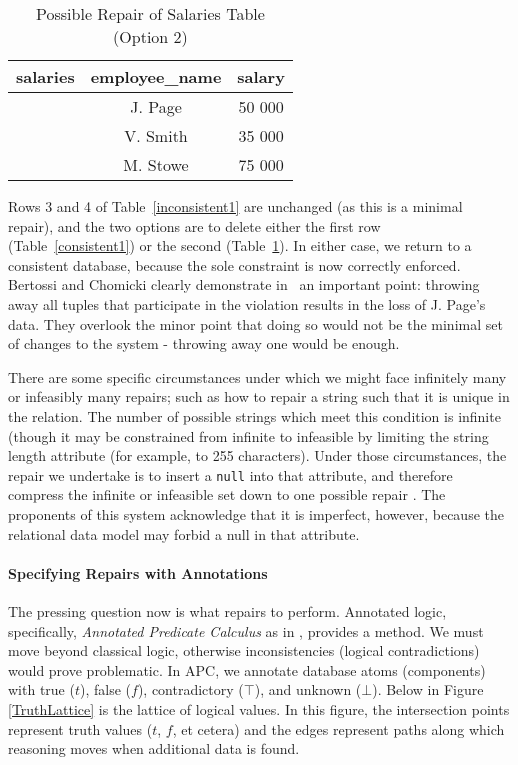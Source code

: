 \documentclass[a4paper]{report}
\begin{document}
\begin{table}[h]\begin{center}
        \begin{tabular}{r | c  c} 
					salaries & employee\_name & salary \\ \hline
	           		 & J. Page  & 50 000 \\ 
					 & V. Smith & 35 000 \\ 
					 & M. Stowe & 75 000 \\ 
        \end{tabular}
        \caption[Possible Repair of Salaries Table (Option 2)]{Possible Repair of Salaries Table (Option 2) \cite{CQ}\label{consistent2}}
\end{center}\end{table}

Rows 3 and 4 of Table~\ref{inconsistent1} are unchanged (as this is a minimal repair), and the two options are to delete either the first row (Table~\ref{consistent1}) or the second (Table~\ref{consistent2}). In either case, we return to a consistent database, because the sole constraint is now correctly enforced. Bertossi and Chomicki clearly demonstrate in~\cite{CQ} an important point: throwing away all tuples that participate in the violation results in the loss of J. Page's data. They overlook the minor point that doing so would not be the minimal set of changes to the system - throwing away one would be enough.

There are some specific circumstances under which we might face infinitely many or infeasibly many repairs; such as how to repair a string such that it is unique in the relation. The number of possible strings which meet this condition is infinite (though it may be constrained from infinite to infeasible by limiting the string length attribute (for example, to 255 characters). Under those circumstances, the repair we undertake is to insert a \texttt{null} into that attribute, and therefore compress the infinite or infeasible set down to one possible repair \cite{CQ}. The proponents of this system acknowledge that it is imperfect, however, because the relational data model may forbid a null in that attribute.

\paragraph{Specifying Repairs with Annotations}
The pressing question now is what repairs to perform. Annotated logic, specifically, \textit{Annotated Predicate Calculus} as in \cite{CQ}, provides a method. We must move beyond classical logic, otherwise inconsistencies (logical contradictions) would prove problematic. In APC, we annotate database atoms (components) with true ($t$), false ($f$), contradictory ($\top$), and unknown ($\bot$). Below in Figure \ref{TruthLattice} is the lattice of logical values. In this figure, the intersection points represent truth values ($t$, $f$, et cetera) and the edges represent paths along which reasoning moves when additional data is found.
\end{document}
